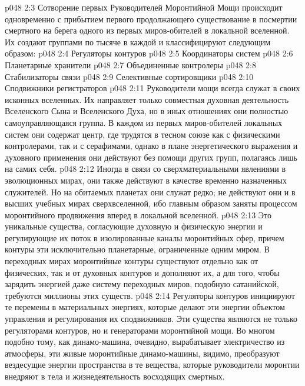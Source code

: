 \vs p048 2:3 Сотворение первых Руководителей Моронтийной Мощи происходит одновременно с прибытием первого продолжающего существование в посмертии смертного на берега одного из первых миров\hyp{}обителей в локальной вселенной. Их создают группами по тысяче в каждой и классифицируют следующим образом:
\vs p048 2:4 \bibnobreakspace Регуляторы контуров
\vs p048 2:5 \bibnobreakspace Координаторы систем
\vs p048 2:6 \bibnobreakspace Планетарные хранители
\vs p048 2:7 \bibnobreakspace Объединенные контролеры
\vs p048 2:8 \bibnobreakspace Стабилизаторы связи
\vs p048 2:9 \bibnobreakspace Селективные сортировщики
\vs p048 2:10 \bibnobreakspace Сподвижники регистраторов
\vs p048 2:11 \pc Руководители мощи всегда служат в своих исконных вселенных. Их направляет только совместная духовная деятельность Вселенского Сына и Вселенского Духа, но в иных отношениях они полностью самоуправляющаяся группа. В каждом из первых миров\hyp{}обителей локальных систем они содержат центр, где трудятся в тесном союзе как с физическими контролерами, так и с серафимами, однако в плане энергетического выражения и духовного применения они действуют без помощи других групп, полагаясь лишь на самих себя.
\vs p048 2:12 Иногда в связи со сверхматериальными явлениями в эволюционных мирах, они также действуют в качестве временно назначенных служителей. Но на обитаемых планетах они служат редко; не действуют они и в высших учебных мирах сверхвселенной, ибо главным образом заняты процессом моронтийного продвижения вперед в локальной вселенной.
\vs p048 2:13 \bibnobreakspace {} Это уникальные существа, согласующие духовную и физическую энергии и регулирующие их поток в изолированные каналы моронтийных сфер, причем контуры эти исключительно планетарные, ограниченные одним миром. В переходных мирах моронтийные контуры существуют отдельно как от физических, так и от духовных контуров и дополняют их, а для того, чтобы зарядить энергией даже систему переходных миров, подобную сатанийской, требуются миллионы этих существ.
\vs p048 2:14 Регуляторы контуров инициируют те перемены в материальных энергиях, которые делают эти энергии объектом управления и регулирования их сподвижников. Эти существа являются не только регуляторами контуров, но и генераторами моронтийной мощи. Во многом подобно тому, как динамо\hyp{}машина, очевидно, вырабатывает электричество из атмосферы, эти живые моронтийные динамо\hyp{}машины, видимо, преобразуют вездесущие энергии пространства в те вещества, которые руководители моронтии внедряют в тела и жизнедеятельность восходящих смертных.
